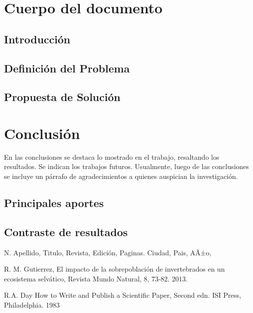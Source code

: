 \documentclass[letter,12pt]{report}
\begin{document}
\chapter{Cuerpo del documento}
\blindtext %

\section{Introducción}
\blindtext %

\section{Definición del Problema}
\blindtext %

\section{Propuesta de Solución}
\blindtext %



\chapter{Conclusión}
En las conclusiones se destaca lo mostrado en el trabajo, resaltando los resultados. Se indican los trabajos futuros. Usualmente, luego de las conclusiones se incluye un párrafo de agradecimientos a quienes auspician la investigación.
\section{Principales aportes}
\blindtext %

\section{Contraste de resultados}
\blindtext %






%
%

\begin{thebibliography}{}
 N. Apellido, Titulo, Revista, Edición, Paginas. Ciudad, Pais, AÃ±o,

 R. M. Gutierrez, El impacto de la sobrepoblación de invertebrados en un ecosistema selvático, Revista Mundo Natural, 8, 73-82. 2013.

 R.A. Day How to Write and Publish a Scientific Paper, Second edn. ISI Press, Philadelphia. 1983

\end{thebibliography}  
\end{document}
